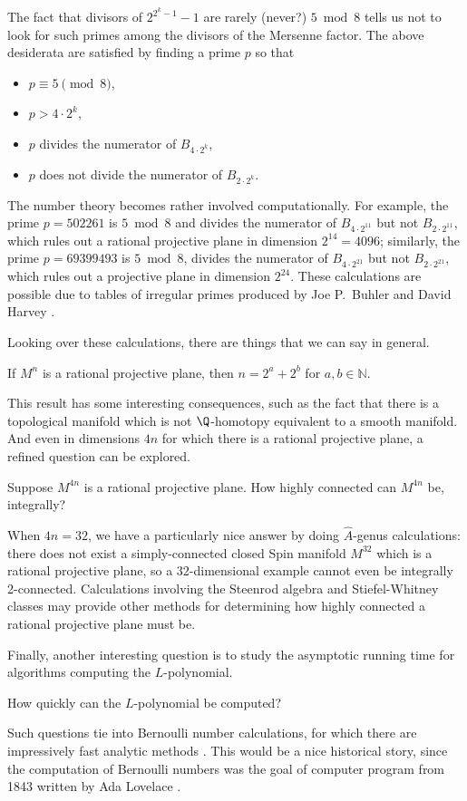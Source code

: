 The fact that divisors of $2^{2^k - 1} - 1$ are rarely (never?)
$5 \bmod 8$ tells us not to look for such primes among the divisors of
the Mersenne factor.  The above desiderata are satisfied by finding a
prime $p$ so that
\begin{itemize}
    \item $p \equiv 5 \pmod 8$,
    \item $p > 4 \cdot 2^k$,
    \item $p$ divides the numerator of $B_{4 \cdot 2^k}$,
    \item $p$ does not divide the numerator of $B_{2 \cdot 2^k}$.
\end{itemize}
The number theory becomes rather involved computationally.  For
example, the prime $p = 502261$ is $5 \bmod 8$ and divides the
numerator of $B_{4 \cdot 2^{11}}$ but not $B_{2 \cdot 2^{11}}$, which rules
out a rational projective plane in dimension $2^{14} = 4096$;
similarly, the prime $p = 69399493$ is $5 \bmod 8$, divides the
numerator of $B_{4 \cdot 2^{21}}$ but not $B_{2 \cdot 2^{21}}$, which rules
out a projective plane in dimension $2^{24}$.  These calculations are
possible due to tables of irregular primes produced by Joe P.~Buhler
and David Harvey \cite{MR2813369}.

Looking over these calculations, there are things that we can say in general.
\begin{theorem}[Fowler--Su]
  If $M^n$ is a rational projective plane, then $n = 2^a + 2^b$ for
  $a, b \in \mathbb{N}$.
\end{theorem}
This result has some interesting consequences, such as the fact that
there is a topological manifold which is not $\Q$-homotopy equivalent
to a smooth manifold.  And even in dimensions $4n$ for which there is
a rational projective plane, a refined question can be explored.
\begin{question}
  Suppose $M^{4n}$ is a rational projective plane.  How highly
  connected can $M^{4n}$ be, integrally?
\end{question}
When $4n = 32$, we have a particularly nice answer by doing
$\hat{A}$-genus calculations: there does not exist a simply-connected
closed Spin manifold $M^{32}$ which is a rational projective plane, so
a 32-dimensional example cannot even be integrally 2-connected.
Calculations involving the Steenrod algebra and Stiefel-Whitney
classes may provide other methods for determining how highly connected
a rational projective plane must be.

Finally, another interesting question is to study the asymptotic
running time for algorithms computing the $L$-polynomial.
\begin{question}
How quickly can the $L$-polynomial be computed?
\end{question}
Such questions tie into Bernoulli number calculations, for which there
are impressively fast analytic methods \cite{MR2684369}.  This would
be a nice historical story, since the computation of Bernoulli numbers
was the goal of computer program from 1843 written by Ada Lovelace
\cite{MR550674}.
